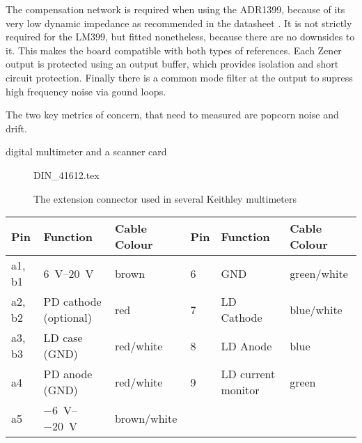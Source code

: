 The compensation network is required when using the ADR1399, because of its very low dynamic impedance as recommended in the datasheet \cite{datasheet_ADR1399}. It is not strictly required for the LM399, but fitted nonetheless, because there are no downsides to it. This makes the board compatible with both types of references. Each Zener output is protected using an output buffer, which provides isolation and short circuit protection. Finally there is a common mode filter at the output to supress high frequency noise via gound loops.

The two key metrics of concern, that need to measured are popcorn noise and drift.

digital multimeter and a scanner card


\begin{figure}[ht]
    \centering
    {DIN_41612.tex}
    \caption{The extension connector used in several Keithley multimeters}
\end{figure}

\begin{tabular}{llllll}
    \toprule
    Pin    & Function    & Cable Colour    & Pin    & Function    &  Cable Colour\\
    \midrule
    a1, b1    & \SIrange[explicit-sign=+]{6}{20}{\volt}    & brown    & \num{6}    & GND    & green/white\\
    a2, b2    & PD cathode (optional)    & red    & \num{7}    & LD Cathode    & blue/white\\
    a3, b3    & LD case (GND)    & red/white    & \num{8}    & LD Anode    & blue\\
    a4    & PD anode (GND)    & red/white    & \num{9}    & LD current monitor    & green\\
    a5    & \SIrange{-6}{-20}{\volt}    & brown/white\\
    \bottomrule
\end{tabular}

